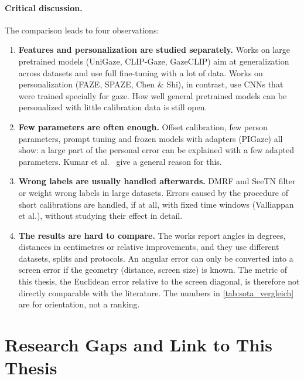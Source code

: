 \paragraph{Critical discussion.}
The comparison leads to four observations:
\begin{enumerate}
  \item \textbf{Features and personalization are studied separately.} Works on
        large pretrained models (UniGaze, CLIP-Gaze, GazeCLIP) aim at
        generalization across datasets and use full fine-tuning with a lot of
        data. Works on personalization (FAZE, SPAZE, Chen \& Shi), in contrast,
        use CNNs that were trained specially for gaze. How well general
        pretrained models can be personalized with little calibration data is
        still open.
  \item \textbf{Few parameters are often enough.} Offset calibration, few person
        parameters, prompt tuning and frozen models with adapters (PIGaze) all
        show: a large part of the personal error can be explained with a few
        adapted parameters. Kumar et al.~\cite{kumar2022finetuning} give a
        general reason for this.
  \item \textbf{Wrong labels are usually handled afterwards.} DMRF and SeeTN
        filter or weight wrong labels in large datasets. Errors caused by the
        procedure of short calibrations are handled, if at all, with fixed time
        windows (Valliappan et al.), without studying their effect in detail.
  \item \textbf{The results are hard to compare.} The works report angles in
        degrees, distances in centimetres or relative improvements, and they use
        different datasets, splits and protocols. An angular error can only be
        converted into a screen error if the geometry (distance, screen size)
        is known. The metric of this thesis, the Euclidean error relative to the
        screen diagonal, is therefore not directly comparable with the
        literature. The numbers in \cref{tab:sota_vergleich} are for
        orientation, not a ranking.
\end{enumerate}

\section{Research Gaps and Link to This Thesis}
\label{sec:luecken}
